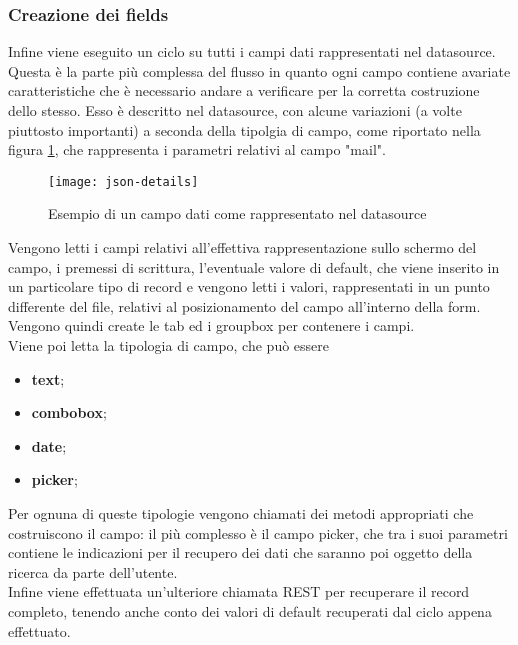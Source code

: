\subsubsection{Creazione dei fields}
Infine viene eseguito un ciclo su tutti i campi dati rappresentati nel datasource. Questa è la parte più complessa del flusso in quanto ogni campo contiene avariate caratteristiche che è necessario andare a verificare per la corretta costruzione dello stesso. Esso è descritto nel datasource, con alcune variazioni (a volte piuttosto importanti) a seconda della tipolgia di campo, come riportato nella figura \ref{fig:json-detail}, che rappresenta i parametri relativi al campo "mail".\\  
	\begin{figure}[h]
		\centering
		\texttt{[image: json-details]}
		\caption{Esempio di un campo dati come rappresentato nel datasource}
		\label{fig:json-detail}
	\end{figure}
Vengono letti i campi relativi all'effettiva rappresentazione sullo schermo del campo, i premessi di scrittura, l'eventuale valore di default, che viene inserito in un particolare tipo di \gls{record} e vengono letti i valori, rappresentati in un punto differente del file, relativi al posizionamento del campo all'interno della form.\\
Vengono quindi create le tab ed i groupbox per contenere i campi.\\
Viene poi letta la tipologia di campo, che può essere
\begin{itemize}
	\item \textbf{text};
	\item \textbf{combobox};
	\item \textbf{date};
	\item \textbf{picker};
\end{itemize}
Per ognuna di queste tipologie vengono chiamati dei metodi appropriati che costruiscono il campo: il più complesso è il campo picker, che tra i suoi parametri contiene le indicazioni per il recupero dei dati che saranno poi oggetto della ricerca da parte dell'utente.\\
Infine viene effettuata un'ulteriore chiamata REST per recuperare il record completo, tenendo anche conto dei valori di default recuperati dal ciclo appena effettuato.

\newpage